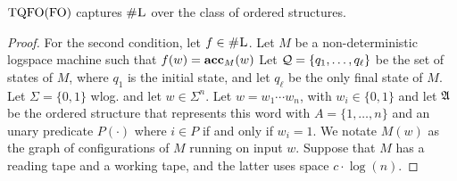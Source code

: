 \begin{theorem}
	${\rm TQFO}({\rm FO})$ captures $\text{\sc \#L}$ over the class of ordered structures.
\end{theorem}
\begin{proof}
	For the second condition, let $f \in \text{\sc \#L}$. Let $M$ be a non-deterministic logspace machine such that $f(w) = \textbf{acc}_M(w)$ Let ${\cal Q} = \{q_1,\ldots,q_{\ell}\}$ be the set of states of $M$, where $q_1$ is the initial state, and let $q_{\ell}$ be the only final state of $M$. Let $\Sigma = \{0,1\}$ wlog. and let $w\in\Sigma^n$. Let $w = w_1\cdots w_n$, with $w_i \in \{0,1\}$ and let $\mathfrak{A}$ be the ordered structure that represents this word with $A = \{1,\ldots,n\}$ and an unary predicate $P(\cdot)$ where $i\in P$ if and only if $w_i = 1$. We notate $M(w)$ as the graph of configurations of $M$ running on input $w$. Suppose that $M$ has a reading tape and a working tape, and the latter uses space $c\cdot\log(n)$.
	

\end{proof}
